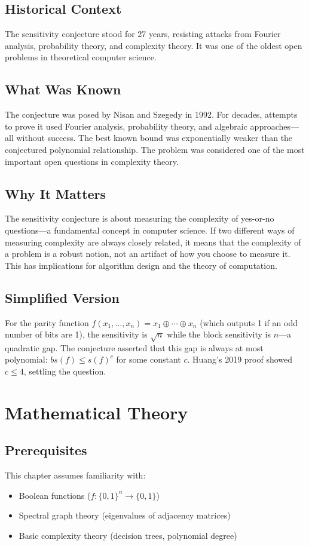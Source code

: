 \subsection{Historical Context}
The sensitivity conjecture stood for 27 years, resisting attacks from Fourier analysis, probability theory, and complexity theory. It was one of the oldest open problems in theoretical computer science.

\subsection{What Was Known}
The conjecture was posed by Nisan and Szegedy in 1992. For decades, attempts to prove it used Fourier analysis, probability theory, and algebraic approaches---all without success. The best known bound was exponentially weaker than the conjectured polynomial relationship. The problem was considered one of the most important open questions in complexity theory.

\subsection{Why It Matters}
The sensitivity conjecture is about measuring the complexity of yes-or-no questions---a fundamental concept in computer science. If two different ways of measuring complexity are always closely related, it means that the complexity of a problem is a robust notion, not an artifact of how you choose to measure it. This has implications for algorithm design and the theory of computation.

\subsection{Simplified Version}
For the parity function $f(x_1, \ldots, x_n) = x_1 \oplus \cdots \oplus x_n$ (which outputs 1 if an odd number of bits are 1), the sensitivity is $\sqrt{n}$ while the block sensitivity is $n$---a quadratic gap. The conjecture asserted that this gap is always at most polynomial: $bs(f) \le s(f)^c$ for some constant $c$. Huang's 2019 proof showed $c \le 4$, settling the question.

\section{Mathematical Theory}

\subsection{Prerequisites}
This chapter assumes familiarity with:
\begin{itemize}
\item Boolean functions ($f: \{0,1\}^n \to \{0,1\}$)
\item Spectral graph theory (eigenvalues of adjacency matrices)
\item Basic complexity theory (decision trees, polynomial degree)
\end{itemize}

